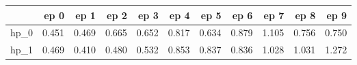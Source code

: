 \begin{tabular}{lrrrrrrrrrr}
\toprule
{} &   ep 0 &   ep 1 &   ep 2 &   ep 3 &   ep 4 &   ep 5 &   ep 6 &   ep 7 &   ep 8 &   ep 9 \\
\midrule
hp\_0 &  0.451 &  0.469 &  0.665 &  0.652 &  0.817 &  0.634 &  0.879 &  1.105 &  0.756 &  0.750 \\
hp\_1 &  0.469 &  0.410 &  0.480 &  0.532 &  0.853 &  0.837 &  0.836 &  1.028 &  1.031 &  1.272 \\
\bottomrule
\end{tabular}
